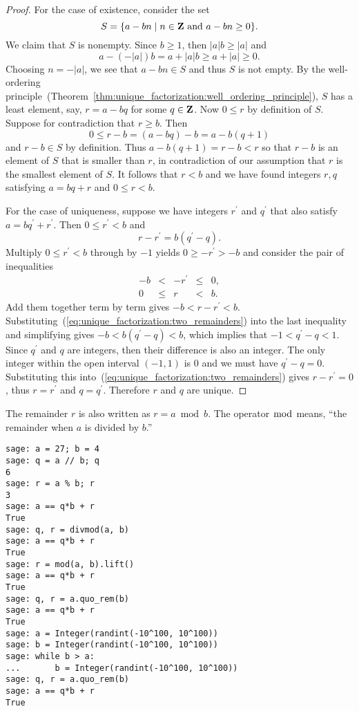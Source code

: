 \begin{proof}
For the case of existence, consider the set
\[
S
=
\{a - bn \;|\; n \in \mathbf{Z} \text{ and } a - bn \geq 0 \}.
\]
We claim that $S$ is nonempty. Since $b \geq 1$, then $|a|b \geq |a|$
and
\[
a - (-|a|)b
=
a + |a|b \geq a + |a| \geq 0.
\]
Choosing $n = -|a|$, we see that $a - bn \in S$ and thus $S$ is not
empty. By the well-ordering
principle~(Theorem~\ref{thm:unique_factorization:well_ordering_principle}),
$S$ has a least element, say, $r = a - bq$ for some $q \in \mathbf{Z}$. Now
$0 \leq r$ by definition of $S$. Suppose for contradiction that
$r \geq b$. Then
\[
0 \leq r - b = (a - bq) - b = a - b(q + 1)
\]
and $r - b \in S$ by definition. Thus $a - b(q + 1) = r - b < r$ so
that $r - b$ is an element of $S$ that is smaller than $r$, in
contradiction of our assumption that $r$ is the smallest element of
$S$. It follows that $r < b$ and we have found integers $r,q$
satisfying $a = bq + r$ and $0 \leq r < b$.

For the case of uniqueness, suppose we have integers $r^\prime$ and
$q^\prime$ that also satisfy $a = bq^{\prime} + r^{\prime}$. Then
$0 \leq r^\prime < b$ and
%
\begin{equation}
\label{eq:unique_factorization:two_remainders}
r - r^\prime
=
b(q^\prime - q).
\end{equation}
%
Multiply $0 \leq r^\prime < b$ through by $-1$ yields $0 \geq
-r^\prime > -b$ and consider the pair of inequalities
\[
\begin{array}{rcccl}
-b &<   & -r^\prime &\leq & 0, \\
0 &\leq & r         &<    & b.
\end{array}
\]
Add them together term by term gives $-b < r - r^\prime < b$.
Substituting~(\ref{eq:unique_factorization:two_remainders}) into the
last inequality and simplifying gives $-b < b(q^\prime - q) < b$,
which implies that $-1 < q^\prime - q < 1$. Since $q^\prime$ and $q$
are integers, then their difference is also an integer. The only
integer within the open interval $(-1, 1)$ is 0 and we must have
$q^\prime - q = 0$. Substituting this
into~(\ref{eq:unique_factorization:two_remainders}) gives
$r - r^\prime = 0$, thus $r = r^\prime$ and $q = q^\prime$. Therefore
$r$ and $q$ are unique.
\end{proof}

The remainder $r$ is also written as $r = a \bmod b$\index{$\bmod$}. The
operator $\bmod$ means, ``the remainder when $a$ is divided by $b$.''

\begin{lstlisting}
sage: a = 27; b = 4
sage: q = a // b; q
6
sage: r = a % b; r
3
sage: a == q*b + r
True
sage: q, r = divmod(a, b)
sage: a == q*b + r
True
sage: r = mod(a, b).lift()
sage: a == q*b + r
True
sage: q, r = a.quo_rem(b)
sage: a == q*b + r
True
sage: a = Integer(randint(-10^100, 10^100))
sage: b = Integer(randint(-10^100, 10^100))
sage: while b > a:
...       b = Integer(randint(-10^100, 10^100))
sage: q, r = a.quo_rem(b)
sage: a == q*b + r
True
\end{lstlisting}


